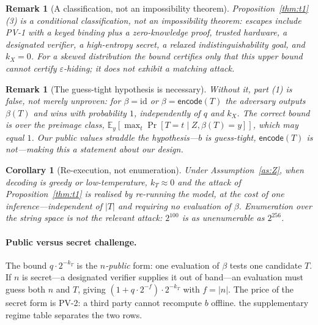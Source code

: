 \documentclass[10pt,journal,compsoc]{IEEEtran}
\newtheorem{corollary}[theorem]{Corollary}
\newtheorem{remark}[theorem]{Remark}
\newcommand{\need}[1]{}
\newcommand{\need}[1]{\textcolor{blue}{[[ NEED: #1 ]]}}
\begin{document}
\begin{remark}[A classification, not an impossibility theorem]
\label{rem:trilemma-scope}
Proposition~\ref{thm:t1}(3) is a \emph{conditional classification}, not an
impossibility theorem: escapes include PV-1 with a keyed binding plus a
zero-knowledge proof, trusted hardware, a designated verifier, a high-entropy
secret, a relaxed indistinguishability goal, and $k_X=0$. For a skewed
distribution the bound certifies only that this upper bound cannot certify
$\varepsilon$-hiding; it does not exhibit a matching attack.
\end{remark}

\begin{remark}[The guess-tight hypothesis is necessary]
\label{rem:betanecessary}
Without it, part (1) is false, not merely unproven: for
$\beta=\mathrm{id}$ or $\beta=\mathsf{encode}(T)$ the adversary outputs
$\beta(T)$ and wins with probability $1$, independently of $q$ and $k_X$. The
correct bound is over the preimage class,
$\mathbb{E}_y[\max_t\Pr[T=t\mid Z,\beta(T)=y]]$, which may equal $1$. Our public
values straddle the hypothesis---$b$ is guess-tight, $\mathsf{encode}(T)$ is
not---making this a statement about \emph{our design}.
\end{remark}

\need{BLOCKER (theorem-level, no external resource): the bounds are random-oracle
heuristics. Replacing the random oracle with a standard-model assumption for
SHA-256 would require a different proof, which is not available; the paper
therefore claims these bounds only in the random-oracle model and records the
SHA-256 instantiation loss in $\mathrm{negl}(\lambda)$.}

\begin{corollary}[Re-execution, not enumeration]
\label{cor:reexec}
Under Assumption~\ref{as:Z}, when decoding is greedy or low-temperature,
$k_T\approx 0$ and the attack of Proposition~\ref{thm:t1} is realised by
\emph{re-running the model}, at the cost of one inference---independent of $|T|$
and requiring \emph{no} evaluation of $\beta$. Enumeration over the string space
is \emph{not} the relevant attack: $2^{100}$ is as unenumerable as $2^{256}$.
\end{corollary}

\paragraph{Public versus secret challenge.} The bound $q\cdot2^{-k_T}$ is the
\emph{$n$-public} form: one evaluation of $\beta$ tests one candidate $T$. If
$n$ is secret---a designated verifier supplies it out of band---an evaluation
must guess both $n$ and $T$, giving $(1+q\cdot2^{-f})\cdot2^{-k_T}$ with
$f=|n|$. The price of the secret form is PV-2: a third party cannot recompute
$b$ offline. the supplementary regime table separates the two rows.
\end{document}
